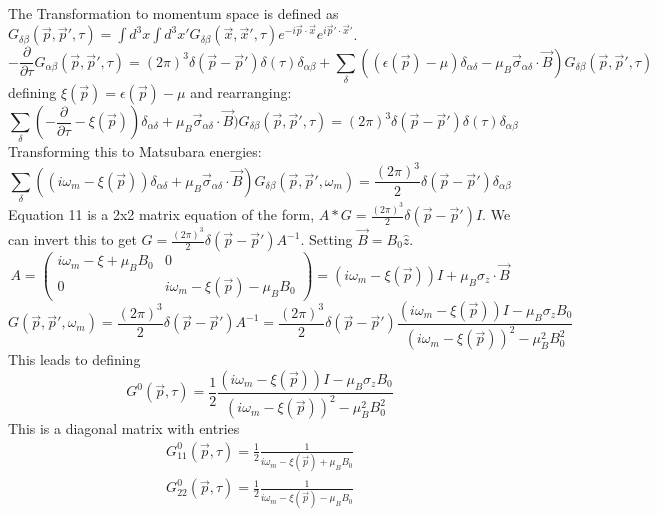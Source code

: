 \documentclass{article}
\begin{document}
The Transformation to momentum space is defined as $G_{\delta\beta}(\vec{p},\vec{p}',\tau)=\int d^3x\int d^3x'G_{\delta\beta}(\vec{x},\vec{x}',\tau)e^{-i\vec{p}\cdot\vec{x}}e^{i\vec{p}'\cdot\vec{x}'}$.
\begin{equation}
-\frac{\partial}{\partial\tau}G_{\alpha\beta}(\vec{p},\vec{p}',\tau)=(2\pi)^3\delta(\vec{p}-\vec{p}')\delta(\tau)\delta_{\alpha\beta}+\sum\limits_{\delta} ((\epsilon(\vec{p})-\mu)\delta_{\alpha\delta}-\mu_B \vec{\sigma}_{\alpha\delta} \cdot \vec{B})G_{\delta\beta}(\vec{p},\vec{p}',\tau)
\end{equation}
defining $\xi(\vec{p})=\epsilon(\vec{p})-\mu$ and rearranging:
\begin{equation}
\sum\limits_\delta(-\frac{\partial}{\partial\tau}-\xi(\vec{p}))\delta_{\alpha\delta}+\mu_B\vec{\sigma}_{\alpha\delta}\cdot\vec{B})G_{\delta\beta}(\vec{p},\vec{p}',\tau)=(2\pi)^3\delta(\vec{p}-\vec{p}')\delta(\tau)\delta_{\alpha\beta}
\end{equation}
Transforming this to Matsubara energies:
\begin{equation}
\sum\limits_\delta((i\omega_m-\xi(\vec{p}))\delta_{\alpha\delta}+\mu_B\vec{\sigma}_{\alpha\delta}\cdot\vec{B})G_{\delta\beta}(\vec{p},\vec{p}',\omega_m)=\frac{(2\pi)^3}{2}\delta(\vec{p}-\vec{p}')\delta_{\alpha\beta}
\end{equation}
Equation 11 is a 2x2 matrix equation of the form, $A*G=\frac{(2\pi)^3}{2}\delta(\vec{p}-\vec{p}')I$. We can invert this to get $G=\frac{(2\pi)^3}{2}\delta(\vec{p}-\vec{p}')A^{-1}$. Setting $\vec{B}=B_0\hat{z}$.
\begin{equation}
A=\left( \begin{array}{cc}
i\omega_m-\xi+\mu_B B_0 & 0 \\
0 & i\omega_m-\xi(\vec{p})-\mu_BB_0\end{array} \right)=(i\omega_m-\xi(\vec{p}))I+\mu_B\sigma_z\cdot\vec{B}
\end{equation}
\begin{equation}
G(\vec{p},\vec{p}',\omega_m)=\frac{(2\pi)^3}{2}\delta(\vec{p}-\vec{p}')A^{-1}=\frac{(2\pi)^3}{2}\delta(\vec{p}-\vec{p}')\frac{(i\omega_m-\xi(\vec{p}))I-\mu_B\sigma_zB_0}{(i\omega_m-\xi(\vec{p}))^2-\mu_B^2B_0^2}
\end{equation}
This leads to defining
\begin{equation}
G^0(\vec{p},\tau)=\frac{1}{2}\frac{(i\omega_m-\xi(\vec{p}))I-\mu_B\sigma_zB_0}{(i\omega_m-\xi(\vec{p}))^2-\mu_B^2B_0^2}
\end{equation}
This is a diagonal matrix with entries
\begin{align*}
G^0_{11}(\vec{p},\tau)=\frac{1}{2}\frac{1}{i\omega_m-\xi(\vec{p})+\mu_BB_0} \\
G^0_{22}(\vec{p},\tau)=\frac{1}{2}\frac{1}{i\omega_m-\xi(\vec{p})-\mu_BB_0}
\end{align*}
\end{document}
